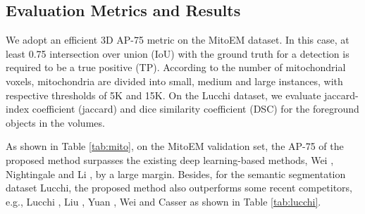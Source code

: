 \documentclass{article}
\begin{document}
\begin{table}[!b]
\centering
{}
\caption{Ablation of main components on the MitoEM-R validation set.}
\label{tab:ablation}
\end{table}

\subsection{Evaluation Metrics and Results}
We adopt an efficient 3D AP-75 metric \cite{wei2020mitoem} on the MitoEM dataset. In this case, at least 0.75 intersection over union (IoU) with the ground truth for a detection is required to be a true positive (TP). According to the number of mitochondrial voxels, mitochondria are divided into small, medium and large instances, with respective thresholds of 5K and 15K. On the Lucchi dataset, we evaluate jaccard-index coefficient (jaccard) and  dice similarity coefficient (DSC) for the foreground objects in the volumes.

As shown in Table \ref{tab:mito}, on the MitoEM validation set, the AP-75 of the proposed method surpasses the existing deep learning-based methods, Wei \cite{wei2020mitoem},  Nightingale \cite{nightingale2021automatic} and Li \cite{li2021contrastive}, by a large margin. Besides, for the semantic segmentation dataset Lucchi, the proposed method also outperforms some recent competitors, e.g., Lucchi \cite{lucchi2013learning}, Liu \cite{liu2020automatic}, Yuan \cite{yuan2020net}, Wei \cite{wei2020mitoem} and Casser \cite{casser2020fast} as shown in Table \ref{tab:lucchi}.
\end{document}
